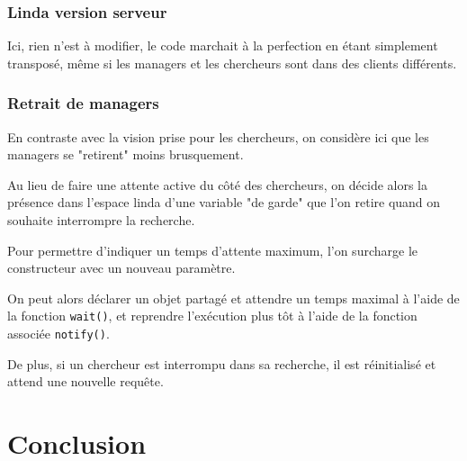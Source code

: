 \documentclass[headings=standardclasses,parskip=half]{scrartcl}
\begin{document}
\subsubsection{Linda version serveur}

Ici, rien n'est à modifier, le code marchait à la perfection en étant simplement transposé, 
même si les managers et les chercheurs sont dans des clients différents.

\subsubsection{Retrait de managers}

En contraste avec la vision prise pour les chercheurs, on considère ici que les managers se "retirent" 
moins brusquement.

Au lieu de faire une attente active du côté des chercheurs, on décide alors la présence dans 
l'espace linda d'une variable "de garde" que l'on retire quand on souhaite interrompre la recherche.

Pour permettre d'indiquer un temps d'attente maximum, l'on surcharge le constructeur avec un nouveau 
paramètre.

On peut alors déclarer un objet partagé et attendre un temps maximal à l'aide de la fonction \texttt{wait()}, 
et reprendre l'exécution plus tôt à l'aide de la fonction associée \texttt{notify()}.

De plus, si un chercheur est interrompu dans sa recherche, il est réinitialisé et attend une nouvelle
requête.

\section{Conclusion}
\end{document}
